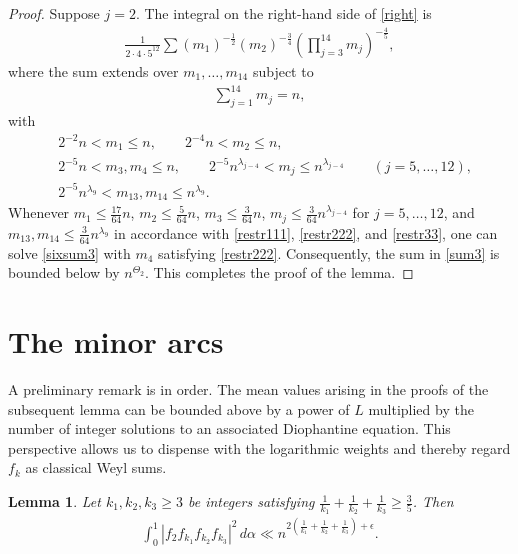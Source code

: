 \documentclass{article}
\theoremstyle{plain}
\newtheorem{lemma}[theorem]{Lemma}
\begin{document}
\begin{proof}
Suppose $j=2$. The integral on the right-hand side of \eqref{right} is
\begin{align}\label{sum3}
    \frac{1}{2\cdot 4 \cdot 5^{12}} \sum (m_1)^{-\frac{1}{2}}(m_2)^{-\frac{3}{4}}\left(\prod_{j=3}^{14}m_j\right)^{-\frac{4}{5}},
\end{align}
where the sum extends over $m_1,\dots,m_{14}$ subject to 
\begin{align}\label{sixsum3}
   \sum_{j=1}^{14} m_j=n,
\end{align}
with
 \begin{align}
    & 2^{-2}n<m_1 \leq n, \qquad 2^{-4}n<m_2 \leq n, \label{restr111}\\
    &2^{-5}n<m_3,m_4\leq n, \qquad2^{-5}n^{\lambda_{j-4}}<m_j\leq n^{\lambda_{j-4}} \qquad (j=5,\dots,12), \label{restr222} \\
    &2^{-5}n^{\lambda_9}<m_{13},m_{14}\leq n^{\lambda_9}. \label{restr33}
\end{align}
Whenever $m_1 \leq \tfrac{17}{64}n$, $m_2\leq \tfrac{5}{64}n$, $m_3 \leq \tfrac{3}{64}n$,  $m_j \leq \tfrac{3}{64}n^{\lambda_{j-4}}$ for $j=5,\dots,12$, and $m_{13},m_{14} \leq \tfrac{3}{64}n^{\lambda_{9}}$ in accordance with \eqref{restr111}, \eqref{restr222}, and \eqref{restr33}, one can solve \eqref{sixsum3} with $m_4$ satisfying \eqref{restr222}. Consequently, the sum in \eqref{sum3} is bounded below by $n^{\Theta_2}$. This completes the proof of the lemma.

    
\end{proof}

\section{The minor arcs}

A preliminary remark is in order. The mean values arising in the proofs of the subsequent lemma can be bounded above by a power of $L$ multiplied by the number of integer solutions to an associated Diophantine equation. This perspective allows us to dispense with the logarithmic weights and thereby regard $f_k$ as classical Weyl sums. 

\begin{lemma}\label{estimatehooley}
    Let $k_1,k_2,k_3\geq 3$ be integers satisfying $\tfrac{1}{k_1}+\tfrac{1}{k_2}+\tfrac{1}{k_3}\geq \tfrac{3}{5}$. Then  
    \begin{align*}
        \int_{0}^{1}|f_2f_{k_1}f_{k_2}f_{k_3}|^2 \, d\alpha \ll n^{2\left( \frac{1}{k_1}+\frac{1}{k_2}+\frac{1}{k_3}\right)+\epsilon}.
    \end{align*}
\end{lemma}
\end{document}
